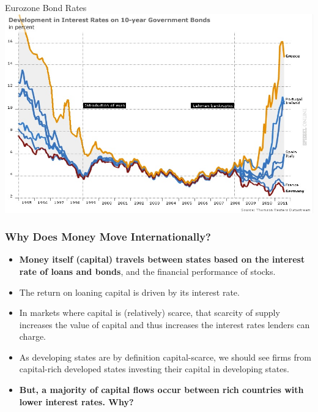 \documentclass{beamer}
\begin{document}
\begin{frame}{\LARGE Eurozone Bond Rates}
	\centering
	\includegraphics[width=\textwidth,height=0.8\textheight,keepaspectratio]{Eurozone rates.jpg}
\end{frame}



\begin{frame} 
	\frametitle{\LARGE{Why Does Money Move Internationally?}}
	\begin{itemize}

			\item \textbf{Money itself (capital) travels between states based on the interest rate of loans and bonds}, and the financial performance of stocks. \pause
			\item The return on loaning capital is driven by its interest rate. \pause
			\item In markets where capital is (relatively) scarce, that scarcity of supply increases the value of capital and thus increases the interest rates lenders can charge. \pause
			\item As developing states are by definition capital-scarce, we should see firms from capital-rich developed states investing their capital in developing states. \pause
			\item \textbf{But, a majority of capital flows occur between rich countries with lower interest rates. Why?}
		
	\end{itemize}
\end{frame}
\end{document}
